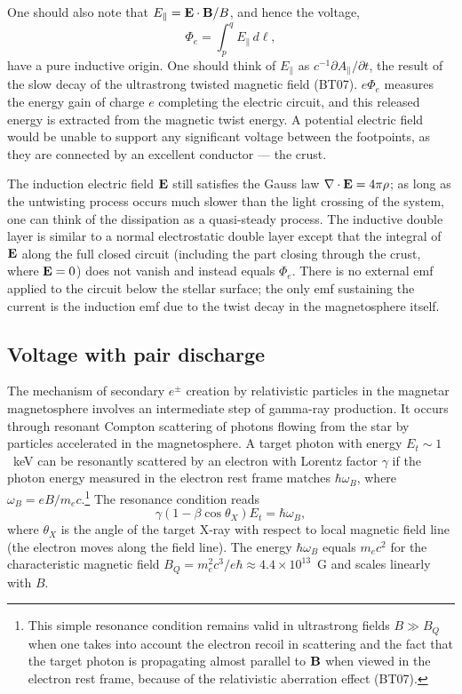 One should also note that $E_\parallel={\mathbf E}\cdot{\mathbf B}/B$, and hence the voltage,
\begin{equation}
\label{eq:phi_e}
  \Phi_{e} = \int_p^{q} E_\parallel\,d\ell,
\end{equation}
have a pure inductive origin. One should think of
$E_\parallel$ as $c^{-1}\partial A_\parallel/\partial t$, the result of the slow decay
of the ultrastrong twisted magnetic field (BT07).
$e\Phi_e$ measures the energy gain of charge $e$ completing the electric circuit,
and this released energy is extracted from the magnetic twist energy.
A potential electric field would be unable to support any significant voltage
between the footpoints, as they are connected by an excellent conductor --- the crust.

The induction electric field ${\mathbf E}$ still satisfies the Gauss law $\nabla\cdot{\mathbf E}=4\pi \rho$;
as long as the untwisting process occurs much slower than the light crossing of
the system, one can think of the dissipation as a quasi-steady process. The inductive
double layer is similar to a normal electrostatic double layer except that
the integral of ${\mathbf E}$ along the full closed circuit (including the part
closing through the crust, where ${\mathbf E}=0$) does not vanish and instead equals $\Phi_e$.
There is no external emf applied to the circuit below the stellar surface; the only emf
sustaining the current is the induction emf due to the twist decay in the magnetosphere
itself.



\subsection{Voltage with pair discharge}
\label{sec:v-with-pair}

The mechanism of secondary $e^\pm$ creation by relativistic particles in the
magnetar magnetosphere  involves an intermediate step of gamma-ray production.
It occurs through resonant Compton scattering of photons flowing from the star
by particles accelerated in the magnetosphere. A target photon with energy
$E_t\sim 1$~keV can be resonantly scattered by an electron with Lorentz factor
$\gamma$ if the photon energy measured in the electron rest frame matches $\hbar\omega_B$,
where $\omega_B=eB/m_ec$.\footnote{This simple resonance condition remains
   valid in ultrastrong fields $B\gg B_Q$ when one takes into account the electron recoil
   in scattering and the fact
   that
   the target photon is propagating almost parallel to ${\mathbf B}$
   when viewed in the electron rest frame, because of the relativistic aberration effect (BT07).}
The resonance condition reads
\begin{equation}
  \label{eq:resonance-condition}
  \gamma(1 - \beta\cos\theta_X)E_t = \hbar\omega_B,
\end{equation}
where $\theta_X$ is the angle of the target X-ray with respect to local magnetic
field line (the electron moves along the field line). The energy $\hbar\omega_B$
equals $m_ec^2$ for the characteristic magnetic field
$B_Q=m_e^2c^3/e\hbar\approx 4.4\times 10^{13}$~G and scales linearly with $B$.

